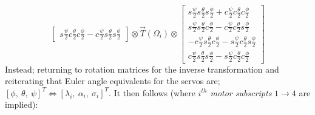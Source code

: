 \begin{subequations}
\begin{equation}
\begin{bmatrix}
s\frac{\psi}{2}c\frac{\theta}{2}c\frac{\phi}{2}-c\frac{\psi}{2}s\frac{\theta}{2}s\frac{\phi}{2}
\end{bmatrix}
\otimes
\vec{T}(\Omega_i)
\otimes
\begin{bmatrix}
s\frac{\psi}{2}s\frac{\theta}{2}s\frac{\phi}{2}+c\frac{\psi}{2}c\frac{\theta}{2}c\frac{\phi}{2}\\
s\frac{\psi}{2}s\frac{\theta}{2}c\frac{\phi}{2}-c\frac{\psi}{2}c\frac{\theta}{2}s\frac{\phi}{2}\\
-c\frac{\psi}{2}s\frac{\theta}{2}c\frac{\phi}{2}-s\frac{\psi}{2}c\frac{\theta}{2}s\frac{\phi}{2}\\
c\frac{\psi}{2}s\frac{\theta}{2}s\frac{\phi}{2}-s\frac{\psi}{2}c\frac{\theta}{2}c\frac{\phi}{2}
\end{bmatrix}
\end{equation}
\end{subequations}
Instead; returning to rotation matrices for the inverse transformation and reiterating that Euler angle equivalents for the servos are; $[\phi,~\theta,~\psi]^T\iff [\lambda_i,~\alpha_i,~\sigma_i]^T$. It then follows (where \emph{$i^{th}$ motor subscripts} $1\rightarrow 4$ are implied):
